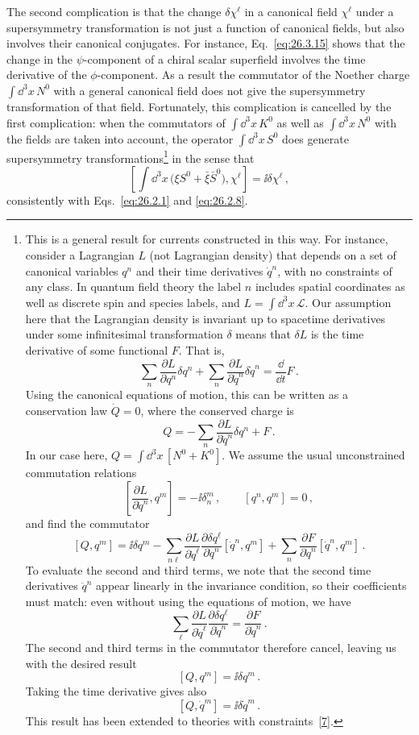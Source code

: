 The second complication is that the change \(\delta\chi^\ell\) in a canonical
field \(\chi^\ell\) under a supersymmetry transformation is not just a
function of canonical fields, but also involves their canonical conjugates.
For instance, Eq.~\eqref{eq:26.3.15} shows that the change in the
\(\psi\)-component of a chiral scalar superfield involves the time derivative
of the \(\phi\)-component. As a result the commutator of the Noether charge
\(\int \dd^3x\,N^0\) with a general canonical field does not give the
supersymmetry transformation of that field. Fortunately, this complication
is cancelled by the first complication: when the commutators of
\(\int \dd^3x\,K^0\) as well as \(\int \dd^3x\,N^0\) with the fields are taken
into account, the operator \(\int \dd^3x\,S^0\) does generate supersymmetry
transformations\footnote{This is a general result for currents constructed in
this way. For instance, consider a Lagrangian \(L\) (not Lagrangian density)
that depends on a set of canonical variables \(q^n\) and their time
derivatives \(\dot q^n\), with no constraints of any class. In quantum field
theory the label \(n\) includes spatial coordinates as well as discrete spin
and species labels, and \(L=\int \dd^3x\,\mathcal{L}\). Our assumption here
that the Lagrangian density is invariant up to spacetime derivatives under
some infinitesimal transformation \(\delta\) means that \(\delta L\) is the
time derivative of some functional \(F\). That is,
\[
  \sum_n\frac{\partial L}{\partial q^n}\delta q^n
  +\sum_n\frac{\partial L}{\partial\dot q^n}\delta\dot q^n
  =\frac{\dd}{\dd t}F\,.
\]
Using the canonical equations of motion, this can be written as a
conservation law \(\dot Q=0\), where the conserved charge is
\[
  Q=-\sum_n\frac{\partial L}{\partial\dot q^n}\delta q^n+F\,.
\]
In our case here, \(Q=\int \dd^3x\,[N^0+K^0]\). We assume the usual
unconstrained commutation relations
\[
  \left[\frac{\partial L}{\partial\dot q^n},q^m\right]
  =-\ii\delta_n^m\,,
  \qquad
  [q^n,q^m]=0\,,
\]
and find the commutator
\[
  [Q,q^m]
  =\ii\delta q^m
  -\sum_{n\ell}
   \frac{\partial L}{\partial\dot q^\ell}
   \frac{\partial\delta q^\ell}{\partial\dot q^n}
   [\dot q^n,q^m]
  +\sum_n
   \frac{\partial F}{\partial\dot q^n}
   [\dot q^n,q^m]\,.
\]
To evaluate the second and third terms, we note that the second time
derivatives \(\ddot q^n\) appear linearly in the invariance condition, so
their coefficients must match: even without using the equations of motion,
we have
\[
  \sum_\ell
  \frac{\partial L}{\partial\dot q^\ell}
  \frac{\partial\delta q^\ell}{\partial\dot q^n}
  =\frac{\partial F}{\partial\dot q^n}\,.
\]
The second and third terms in the commutator therefore cancel, leaving us
with the desired result
\[
  [Q,q^m]=\ii\delta q^m\,.
\]
Taking the time derivative gives also
\[
  [Q,\dot q^m]=\ii\delta\dot q^m\,.
\]
This result has been extended to theories with
constraints~\hyperref[ch26-ref-7]{[7]}.} in the sense that
\begin{equation}
  \left[
    \int \dd^3x\,\bigl(\xi S^0+\bar\xi\bar S^0\bigr),\chi^\ell
  \right]
  =\ii\delta\chi^\ell\,,
  \tag{26.7.6}\label{eq:26.7.6}
\end{equation}
consistently with Eqs.~\eqref{eq:26.2.1} and \eqref{eq:26.2.8}.

